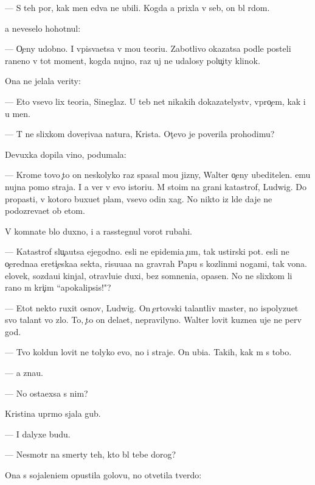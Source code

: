 \documentclass[10pt]{book}
\begin{document}
— S teh por, kak men{\ia} {\y}edva ne ubili. Kogda {\y}a prixla v seb{\ia}, on b{\yi}l r{\ia}dom.

{\Y}a neveselo hohotnul:

— O{\c}eny udobno. I vpis{\yi}va{\y}etsa v mo{\y}u teori{\y}u. Zabotlivo okazatsa podle posteli raneno{\y} v tot moment, kogda nujno, raz uj ne udalosy polu{\c}ity klinok.

Ona ne jelala verity:

— Eto vsevo lix teori{\y}a, Sineglaz{\yi}{\y}. U teb{\ia} net nikakih dokazatelystv, vpro{\c}em, kak i u men{\ia}.

— T{\yi} ne slixkom dover{\c}iva{\y}a natura, Krista. Ot{\c}evo je poverila prohodim{\q}u?

Devuxka dopila vino, podumala:

— Krome tovo {\c}to on neskolyko raz spasal mo{\y}u jizny, Walter o{\c}eny ubeditelen. {\Y}emu nujna pomo{\x} straja. I {\y}a ver{\iu} v {\y}evo istori{\y}u. M{\yi} sto{\y}im na grani katastrof{\yi}, Ludwig. Do propasti, v kotoro{\y} buxu{\y}et plam{\ia}, vsevo odin xag. No nikto iz l{\iu}de{\y} daje ne podozreva{\y}et ob etom.

V komnate b{\yi}lo duxno, i {\y}a rasstegnul vorot rubahi.

— Katastrof{\yi} slu{\c}a{\y}utsa {\y}ejegodno. {\Y}esli ne epidemi{\y}a {\c}um{\yi}, tak {\y}ustirski{\y} pot. {\Y}esli ne o{\c}eredna{\y}a {\y}ereti{\c}eska{\y}a sekta, risu{\y}u{\x}a{\y}a na grav{\iu}rah Papu s kozlin{\yi}mi nogami, tak vo{\y}na. {\C}elovek, sozda{\y}u{\x}i{\y} kinjal{\yi}, otravl{\ia}{\y}u{\x}i{\y}e duxi, bez somneni{\y}a, opasen. No ne slixkom li rano m{\yi} kri{\c}im ``apokalipsis!"?

— Etot nekto ruxit osnov{\yi}, Ludwig. On {\c}ertovski talantliv{\yi}{\y} master, no ispolyzu{\y}et svo{\y} talant vo zlo. To, {\c}to on dela{\y}et, nepravilyno. Walter lovit kuzne{\q}a uje ne perv{\yi}{\y} god.

— Tvo{\y} koldun lovit ne tolyko {\y}evo, no i straje{\y}. On ubi{\y}{\q}a. Takih, kak m{\yi} s tobo{\y}.

— {\Y}a zna{\y}u.

— No osta{\y}exsa s nim?

Kristina upr{\ia}mo sjala gub{\yi}.

— I dalyxe budu.

— Nesmotr{\ia} na smerty teh, kto b{\yi}l tebe dorog?

Ona s sojaleni{\y}em opustila golovu, no otvetila tverdo:
\end{document}
